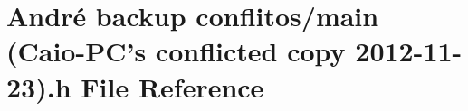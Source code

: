 \hypertarget{main_01_07Caio-PC's_01conflicted_01copy_012012-11-23_08_8h}{\section{André backup conflitos/main (Caio-\/\-P\-C's conflicted copy 2012-\/11-\/23).h File Reference}
\label{main_01_07Caio-PC's_01conflicted_01copy_012012-11-23_08_8h}
}
